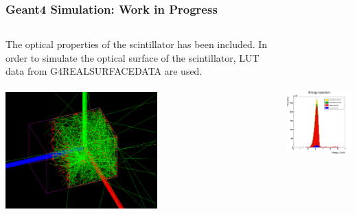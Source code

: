 \documentclass[xcolor=x11names, compress, handout]{beamer}
\renewcommand{\(}{\begin{columns}}
\renewcommand{\)}{\end{columns}}
\newcommand{\<}[1]{\begin{column}{#1}}
\renewcommand{\>}{\end{column}}
\begin{document}
\begin{frame}
\frametitle{Geant4 Simulation: Work in Progress}
  \begin{columns}
  \begin{column}{0.49\textwidth}
  \scriptsize The optical properties of the scintillator has been included. In order to simulate the optical surface of the scintillator, LUT data from G4REALSURFACEDATA are used. \\
 \ \\

  \includegraphics[width=\textwidth,height=4.5cm]{images/opticalproperties_geant4.png}
  \end{column}
  \begin{column}{0.49\textwidth}
  \includegraphics[width=\textwidth,height=6.5cm]{images/energy_spectrum_opticalphotons.jpg}
  \end{column}
  \end{columns}
\end{frame}
\end{document}
